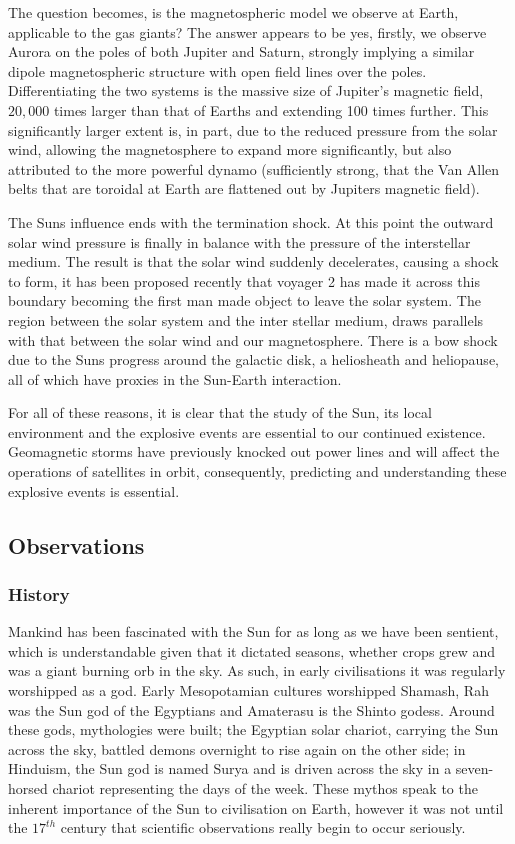 The question becomes, is the magnetospheric model we observe at Earth, applicable to the gas giants?
The answer appears to be yes, firstly, we observe Aurora on the poles of both Jupiter and Saturn, strongly implying a similar dipole magnetospheric structure with open field lines over the poles.
Differentiating the two systems is the massive size of Jupiter's magnetic field, $20,000$ times larger than that of Earths and extending 100 times further.
This significantly larger extent is, in part, due to the reduced pressure from the solar wind, allowing the magnetosphere to expand more significantly, but also attributed to the more powerful dynamo (sufficiently strong, that the Van Allen belts that are toroidal at Earth are flattened out by Jupiters magnetic field).

The Suns influence ends with the termination shock.
At this point the outward solar wind pressure is finally in balance with the pressure of the interstellar medium.
The result is that the solar wind suddenly decelerates, causing a shock to form, it has been proposed recently that voyager 2 has made it across this boundary becoming the first man made object to leave the solar system.
The region between the solar system and the inter stellar medium, draws parallels with that between the solar wind and our magnetosphere.
There is a bow shock due to the Suns progress around the galactic disk, a heliosheath and heliopause, all of which have proxies in the Sun-Earth interaction.

For all of these reasons, it is clear that the study of the Sun, its local environment and the explosive events are essential to our continued existence.
Geomagnetic storms have previously knocked out power lines and will affect the operations of satellites in orbit, consequently, predicting and understanding these explosive events is essential.

\subsection{Observations}

\subsubsection{History}
Mankind has been fascinated with the Sun for as long as we have been sentient, which is understandable given that it dictated seasons, whether crops grew and was a giant burning orb in the sky.
As such, in early civilisations it was regularly worshipped as a god.
Early Mesopotamian cultures worshipped Shamash, Rah was the Sun god of the Egyptians and Amaterasu is the Shinto godess.
Around these gods, mythologies were built; the Egyptian solar chariot, carrying the Sun across the sky, battled demons overnight to rise again on the other side; in Hinduism, the Sun god is named Surya and is driven across the sky in a seven-horsed chariot representing the days of the week.
These mythos speak to the inherent importance of the Sun to civilisation on Earth, however it was not until the $17^{th}$ century that scientific observations really begin to occur seriously.


